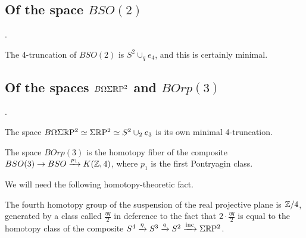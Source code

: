 \documentclass{amsart}
\begin{document}
\subsection{Of the space $BSO(2)$}.

The 4-truncation of $BSO(2)$ is $S^2 \cup_q e_4$, and this is certainly minimal.

\subsection{Of the spaces $B \Omega \Sigma \mathbb R \mathrm{P}^2$ and $B Orp(3)$}.

The space $B \Omega \Sigma \mathbb R \mathrm{P}^2 \simeq \Sigma \mathbb R \mathrm{P}^2 \simeq S^2 \cup_2 e_3$ is its own minimal 4-truncation.

\begin{definition}[$BOrp(3)$]
The space $BOrp(3)$ is the homotopy fiber of the composite $BSO(3) \rightarrow BSO \xrightarrow{p_1} K(\mathbb Z,4)$, where $p_1$ is the first Pontryagin class.
\end{definition}

We will need the following homotopy-theoretic fact.
\begin{proposition}[$\pi_4(\Sigma \RP^2)$]
The fourth homotopy group of the suspension of the real projective plane is $\mathbb Z/4$, generated by a class called $\frac{\eta q}{2}$ in deference to the fact that $2 \cdot \frac{\eta q}{2}$ is equal to the homotopy class of the composite $S^4 \xrightarrow{\eta} S^3 \xrightarrow{q} S^2 \xrightarrow{\text{inc}} \Sigma \mathbb R \mathrm{P}^2$.
\end{proposition}
\end{document}
